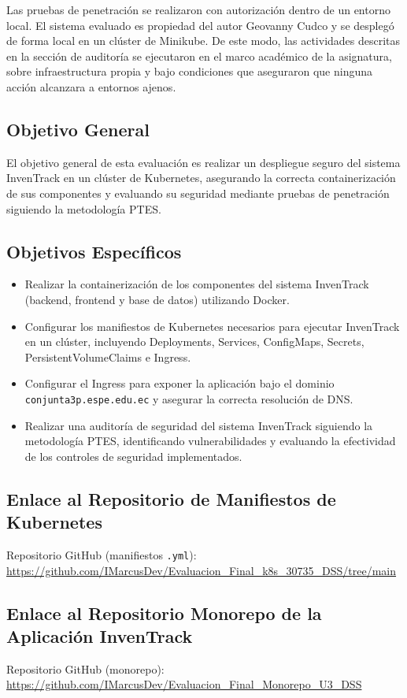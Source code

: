 \documentclass[stu,11pt,spanish,floatsintext]{apa7}
\begin{document}
Las pruebas de penetración se realizaron con autorización dentro de un entorno local. El sistema evaluado es propiedad del autor Geovanny Cudco y se desplegó de forma local en un clúster de Minikube. De este modo, las actividades descritas en la sección de auditoría se ejecutaron en el marco académico de la asignatura, sobre infraestructura propia y bajo condiciones que aseguraron que ninguna acción alcanzara a entornos ajenos.

\subsection{Objetivo General}

El objetivo general de esta evaluación es realizar un despliegue seguro del sistema InvenTrack en un clúster de Kubernetes, asegurando la correcta containerización de sus componentes y evaluando su seguridad mediante pruebas de penetración siguiendo la metodología PTES. 

\subsection{Objetivos Específicos}
\begin{itemize}
  \item Realizar la containerización de los componentes del sistema InvenTrack (backend, frontend y base de datos) utilizando Docker.
  \item Configurar los manifiestos de Kubernetes necesarios para ejecutar InvenTrack en un clúster, incluyendo Deployments, Services, ConfigMaps, Secrets, PersistentVolumeClaims e Ingress.
  \item Configurar el Ingress para exponer la aplicación bajo el dominio \texttt{conjunta3p.espe.edu.ec} y asegurar la correcta resolución de DNS.
  \item Realizar una auditoría de seguridad del sistema InvenTrack siguiendo la metodología PTES, identificando vulnerabilidades y evaluando la efectividad de los controles de seguridad implementados.
\end{itemize}

\subsection{Enlace al Repositorio de Manifiestos de Kubernetes}
Repositorio GitHub (manifiestos \texttt{.yml}): \url{https://github.com/IMarcusDev/Evaluacion_Final_k8s_30735_DSS/tree/main}

\subsection{Enlace al Repositorio Monorepo de la Aplicación InvenTrack}
Repositorio GitHub (monorepo): \url{https://github.com/IMarcusDev/Evaluacion_Final_Monorepo_U3_DSS}
\end{document}

